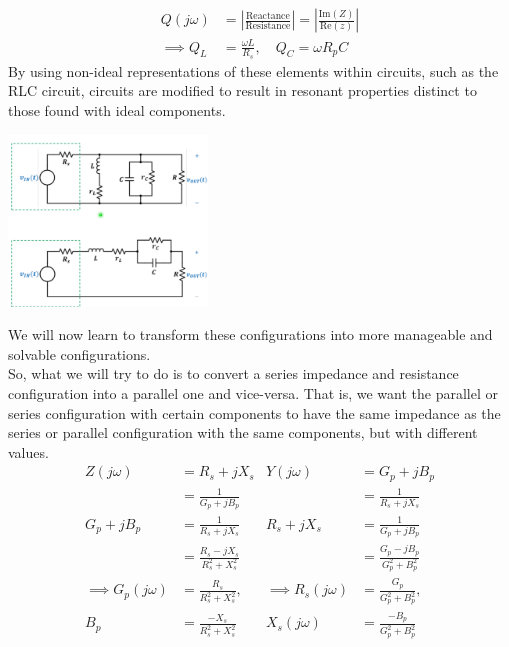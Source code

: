\documentclass[nobib]{tufte-handout}
\begin{document}
\begin{align*}
    Q(j\omega)   & = \left\lvert\frac{\text{Reactance}}{\text{Resistance}}\right\rvert = \left\lvert\frac{\text{Im}(Z)}{\text{Re}(z)}\right\rvert \\
    \implies Q_L & = \frac{\omega L}{R_s},\quad Q_C = \omega R_p C
\end{align*}
By using non-ideal representations of these elements within circuits, such as the RLC circuit, circuits are modified to result in resonant properties distinct to those found with ideal components.\\
\begin{center}
    \includegraphics[width = 200px]{images/nonideal_rlc.png}
\end{center}
We will now learn to transform these configurations into more manageable and solvable configurations. \\
So, what we will try to do is to convert a series impedance and resistance configuration into a parallel one and vice-versa. That is, we want the parallel or series configuration with certain components to have the same impedance as the series or parallel configuration with the same components, but with different values.\\
\begin{align*}
    Z(j\omega)            & = R_s+jX_s                     & Y(j\omega)            & = G_p+jB_p                    \\
                          & = \frac{1}{G_p+jB_p}           &                       & =\frac{1}{R_s+jX_s}           \\
    G_p+jB_p              & = \frac{1}{R_s+jX_s}           & R_s+jX_s              & =\frac{1}{G_p+jB_p}           \\
                          & = \frac{R_s-jX_s}{R_s^2+X_s^2} &                       & =\frac{G_p-jB_p}{G_p^2+B_p^2} \\
    \implies G_p(j\omega) & = \frac{R_s}{R_s^2+X_s^2},     & \implies R_s(j\omega) & = \frac{G_p}{G_p^2+B_p^2},    \\
    B_p                   & = \frac{-X_s}{R_s^2+X_s^2}     & X_s(j\omega)          & = \frac{-B_p}{G_p^2+B_p^2}    \\
\end{align*}
\end{document}
